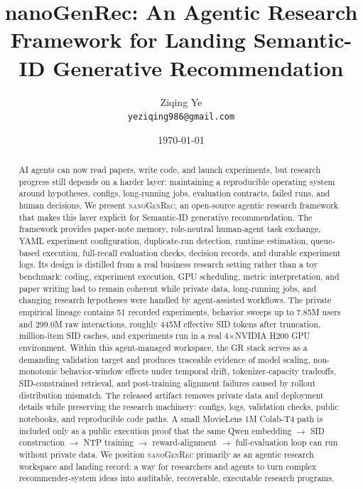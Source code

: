 \documentclass[11pt]{article}
\title{nanoGenRec: An Agentic Research Framework for Landing Semantic-ID Generative Recommendation}
\author{
  Ziqing Ye \\
  \texttt{yeziqing986@gmail.com}
}
\date{\today}
\begin{document}
\maketitle

\begin{abstract}
AI agents can now read papers, write code, and launch experiments, but research progress still depends on a harder layer: maintaining a reproducible operating system around hypotheses, configs, long-running jobs, evaluation contracts, failed runs, and human decisions. We present \textsc{nanoGenRec}, an open-source agentic research framework that makes this layer explicit for Semantic-ID generative recommendation. The framework provides paper-note memory, role-neutral human-agent task exchange, YAML experiment configuration, duplicate-run detection, runtime estimation, queue-based execution, full-recall evaluation checks, decision records, and durable experiment logs. Its design is distilled from a real business research setting rather than a toy benchmark: coding, experiment execution, GPU scheduling, metric interpretation, and paper writing had to remain coherent while private data, long-running jobs, and changing research hypotheses were handled by agent-assisted workflows. The private empirical lineage contains 51 recorded experiments, behavior sweeps up to 7.85M users and 299.0M raw interactions, roughly 445M effective SID tokens after truncation, million-item SID caches, and experiments run in a real 4$\times$NVIDIA H200 GPU environment. Within this agent-managed workspace, the GR stack serves as a demanding validation target and produces traceable evidence of model scaling, non-monotonic behavior-window effects under temporal drift, tokenizer-capacity tradeoffs, SID-constrained retrieval, and post-training alignment failures caused by rollout distribution mismatch. The released artifact removes private data and deployment details while preserving the research machinery: configs, logs, validation checks, public notebooks, and reproducible code paths. A small MovieLens 1M Colab-T4 path is included only as a public execution proof that the same Qwen embedding $\rightarrow$ SID construction $\rightarrow$ NTP training $\rightarrow$ reward-alignment $\rightarrow$ full-evaluation loop can run without private data. We position \textsc{nanoGenRec} primarily as an agentic research workspace and landing record: a way for researchers and agents to turn complex recommender-system ideas into auditable, recoverable, executable research programs.
\end{abstract}
\end{document}
